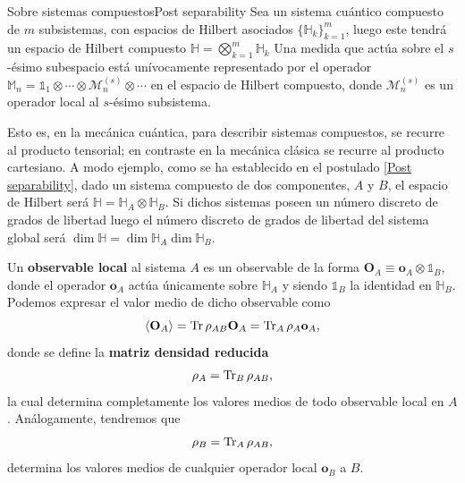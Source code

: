 \documentclass{report} %
\numberwithin{equation}{section}
\begin{document}
\begin{post}{Sobre sistemas compuestos}{Post separability}
Sea un sistema cuántico compuesto de $m$ subsistemas, con espacios de Hilbert asociados $\{\mathds{H}_k\}_{k=1}^{m}$, luego este tendrá un espacio de Hilbert compuesto $\mathds{H} = \bigotimes_{k=1}^{m} \mathds{H}_{k}$ Una medida que actúa sobre el $s$-ésimo subespacio está unívocamente representado por el operador $ \mathds{M}_n = \mathds{1}_1 \otimes \cdots \otimes \mathcal{M}_n^{(s)} \otimes \cdots $ en el espacio de Hilbert compuesto, donde $\mathcal{M}_n^{(s)}$ es un operador local al $s$-ésimo subsistema. 
\label{Post separability}
\end{post}

Esto es, en la mecánica cuántica, para describir sistemas compuestos, se recurre al producto tensorial; en contraste en la mecánica clásica se recurre al producto cartesiano. 
A modo ejemplo, como se ha establecido en el postulado \ref{Post separability}, dado un sistema compuesto de dos componentes, $A$ y $B$, el espacio de Hilbert será $\mathbb{H} = \mathbb{H}_{A}\otimes \mathbb{H}_{B}$. Si dichos sistemas poseen un número discreto de grados de libertad luego el número discreto de grados de libertad del sistema global será $\dim \mathbb{H} = \dim\mathbb{H}_{A}\dim\mathbb{H}_{B}$. 

Un \textbf{observable local} al sistema $A$ es un observable de la forma $\mathbf{O}_A \equiv \mathbf{o}_A \otimes \mathds{1}_B$, donde el operador $\mathbf{o}_A$ actúa únicamente sobre $\mathbb{H}_{A}$ y siendo $\mathds{1}_B$ la identidad en $\mathbb{H}_B$. Podemos expresar el valor medio de dicho observable como
 \begin{equation}
    \langle \mathbf{O}_A \rangle = \Tr\rho_{AB}\mathbf{O}_A = \Tr_{A} \rho_A \mathbf{o}_A,
 \end{equation}
donde se define la \textbf{matriz densidad reducida} \cite{Nielsen.00}
\begin{equation}
    \rho_A = \Tr_{B}\rho_{AB},
\end{equation}
la cual determina completamente los valores medios de todo observable local en $A$. Análogamente, tendremos que 
\begin{equation}
    \rho_B = \Tr_{A} \rho_{AB},
\end{equation}
determina los valores medios de cualquier operador local $\mathbf{o}_B$ a $B$.
\end{document}
